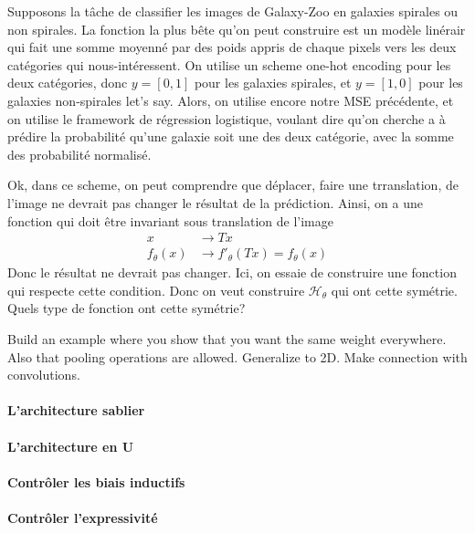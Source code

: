 Supposons la tâche de classifier les images de Galaxy-Zoo en galaxies spirales ou non spirales. La fonction la plus bête qu'on peut construire 
est un modèle linérair qui fait une somme moyenné par des poids appris de chaque pixels vers les deux catégories qui nous-intéressent. On 
utilise un scheme one-hot encoding pour les deux catégories, donc $y = [0, 1]$ pour les galaxies spirales, et $y = [1, 0]$ pour les galaxies non-spirales 
let's say. Alors, on utilise encore notre MSE précédente, et on utilise le framework de régression logistique, voulant dire qu'on cherche a à prédire 
la probabilité qu'une galaxie soit une des deux catégorie, avec la somme des probabilité normalisé.

Ok, dans ce scheme, on peut comprendre que déplacer, faire une trranslation, de l'image ne devrait pas changer le résultat de la prédiction. 
Ainsi, on a une fonction qui doit être invariant sous translation de l'image
\begin{equation}
        \begin{split}
                x &\rightarrow Tx \\
                f_\theta(x) &\rightarrow f'_\theta(Tx) = f_\theta(x)
        \end{split}
\end{equation} 
Donc le résultat ne devrait pas changer. Ici, on essaie de construire une fonction qui respecte cette condition. Donc on veut construire $\mathcal{H}_\theta$ 
qui ont cette symétrie. Quels type de fonction ont cette symétrie?

Build an example where you show that you want the same weight everywhere. Also that pooling operations are allowed. Generalize to 2D. Make connection with 
convolutions.


\paragraph{L'architecture sablier}
\paragraph{L'architecture en U}
\paragraph{Contrôler les biais inductifs}
\paragraph{Contrôler l'expressivité}




